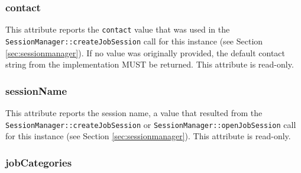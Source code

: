 \documentclass{article}
\newcommand{\h}[1]{\lstinline|#1|}
\newcommand{\rat}[1]{}
\begin{document}
\rat{
Comparison to DRMAA 1.0: The original separation between synchronize() and wait() was replaced by a complete new synchronization semantic in the API. DRMAA2 has now two methods, waitStarted() and waitTerminated(). The first waits for any state that expresses that the job was started, the second for any terminal status. Both methods are available on session level (wait for any of the given jobs to start / end) or on single job level (solves issue \#5880 and \#2838). The session-level functions implement the old DRMAA wait(SESSION\_ANY). The old synchronize() semantics are no longer directly supported - instead, the DRMAA application should use a looped \h{Job.wait... / JobSession.waitAny...} call. The result is a more condensed and responsive API, were the application can decide to keep the user informed during synchronization on a set of jobs. DRMAA library implementations should also become easier to design, since the danger of multithreading side effects inside the DRMAA API is reduced by this change. As a side effect, JOB\_IDS\_SESSION\_ANY and JOB\_IDS\_SESSION\_ALL are no longer needed. The special consideration of a partial failures during SESSION\_ALL wait activities is also no longer necessary (F2F meeting July 2009). The JobSession now allows to fetch also information about jobs that were not submitted through DRMAA (conf. call June 23th 2010).}

\subsubsection{contact}

This attribute reports the \h{contact} value that was used in the \h{SessionManager::createJobSession} call for this instance (see Section \ref{sec:sessionmanager}). If no value was originally provided, the default contact string from the implementation MUST be returned. This attribute is read-only.

\subsubsection{sessionName}

This attribute reports the session name, a value that resulted from the \h{SessionManager::createJobSession} or \h{SessionManager::openJobSession} call for this instance (see Section \ref{sec:sessionmanager}). This attribute is read-only.

\subsubsection{jobCategories}
\label{sec:jobcategorieslist}
\end{document}
